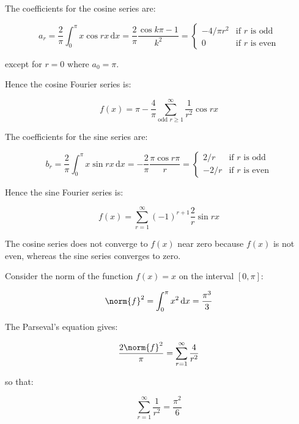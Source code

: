 \documentclass[12pt]{article}
\begin{document}
The coefficients for the cosine series are:

\begin{equation}
    a_{r} = \frac{2}{\pi} \int_{0}^{\pi} x \cos{rx} \, \mathrm{d}x = \frac{2}{\pi} \frac{\cos{k\pi} - 1}{k^{2}} =
    \begin{cases}
        -4/\pi r^{2} & \text{if } r \text{ is odd} \\
        0 & \text{if } r \text{ is even}
    \end{cases}
\end{equation}

except for $r = 0$ where $a_{0} = \pi$.

Hence the cosine Fourier series is:

\begin{equation}
    f(x) = \pi - \frac{4}{\pi} \sum_{\text{odd }r \ge 1}^{\infty} \frac{1}{r^{2}} \cos{rx}
\end{equation}

The coefficients for the sine series are:

\begin{equation}
    b_{r} = \frac{2}{\pi} \int_{0}^{\pi} x \sin{rx} \, \mathrm{d}x = -\frac{2}{\pi} \frac{\pi \cos{r\pi}}{r} =
    \begin{cases}
        2/r & \text{if } r \text{ is odd} \\
        -2/r & \text{if } r \text{ is even}
    \end{cases}
\end{equation}

Hence the sine Fourier series is:

\begin{equation}
    f(x) = \sum_{r = 1}^{\infty} (-1)^{r + 1} \frac{2}{r} \sin{rx}
\end{equation}

The cosine series does not converge to $f(x)$ near zero because $f(x)$ is not even, whereas the sine series converges to zero.

Consider the norm of the function $f(x) = x$ on the interval $[0, \pi]$:

\begin{equation}
    \norm{f}^{2} = \int_{0}^{\pi} x^{2} \, \mathrm{d}x = \frac{\pi^{3}}{3}
\end{equation}

The Parseval's equation gives:

\begin{equation}
    \frac{2\norm{f}^{2}}{\pi} = \sum_{r = 1}^{\infty} \frac{4}{r^{2}}
\end{equation}

so that:

\begin{equation}
    \sum_{r = 1}^{\infty} \frac{1}{r^{2}} = \frac{\pi^{2}}{6}
\end{equation}
\end{document}
